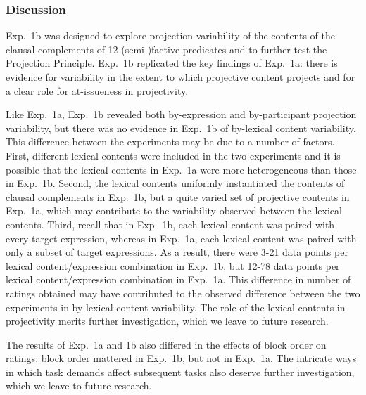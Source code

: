 \documentclass[11pt,fleqn]{article}
\newcommand{\6}{\mbox{$[\hspace*{-.6mm}[$}}
\newcommand{\9}{\mbox{$]\hspace*{-.6mm}]$}}
\begin{document}
%
%
%
%


\subsubsection{Discussion}

Exp.~1b was designed to explore projection variability of the contents of the clausal complements of 12 (semi-)factive predicates and to further test the Projection Principle. Exp.~1b replicated the key findings of Exp.~1a: there is evidence for variability in the extent to which projective content projects and for a clear role for at-issueness in projectivity.

Like Exp.~1a, Exp.~1b revealed both by-expression and by-participant projection variability, but there was no evidence in Exp.~1b of by-lexical content variability. This difference between the experiments may be due to a number of factors. First, different lexical contents were included in the two experiments and it is possible that the lexical contents in Exp.~1a were more heterogeneous than those in Exp.~1b. Second, the lexical contents uniformly instantiated the contents of clausal complements in Exp.~1b, but a quite varied set of projective contents in Exp.~1a, which may contribute to the variability observed between the lexical contents. Third, recall that in Exp.~1b, each lexical content was paired with every target expression, whereas in Exp.~1a, each lexical content was paired with only a subset of target expressions. As a result, there were 3-21 data points per lexical content/expression combination in Exp.~1b, but 12-78 data points per lexical content/expression combination in Exp.~1a. This difference in number of ratings obtained may have contributed to the observed difference between the two experiments in by-lexical content variability. The role of the lexical contents in projectivity merits further investigation, which we leave to future research. 

The results of Exp.~1a and 1b also differed in the effects of block order on ratings: block order mattered in Exp.~1b, but not in Exp.~1a. The intricate ways in which task demands affect subsequent tasks also deserve further investigation, which we leave to future research.
\end{document}
